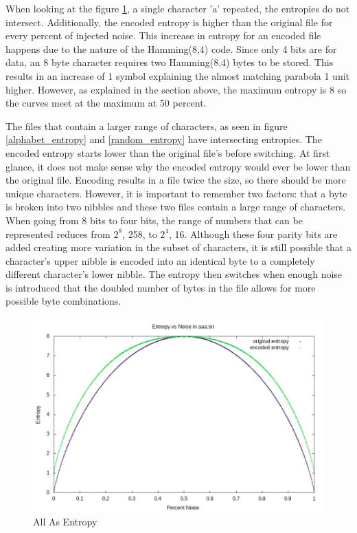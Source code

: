 \documentclass[12pt]{article}
\begin{document}
When looking at the figure \ref{aaa_entropy}, a single character 'a' repeated, the entropies
do not intersect.
Additionally, the encoded entropy is higher than the original file for every percent of injected
noise. This increase in entropy for an encoded file happens due to the nature of the Hamming(8,4)
code. Since only 4 bits are for data, an 8 byte character requires two Hamming(8,4) bytes to be
stored. This results in an increase of 1 symbol explaining the almost matching parabola 1 unit higher.
However, as explained in the section above, the maximum entropy is 8 so the curves meet at the maximum at 50 percent.

The files that contain a larger range of characters, as seen in figure \ref{alphabet_entropy}
and \ref{random_entropy} have intersecting entropies.
The encoded entropy starts lower than the original file's before switching.
At first glance, it does not make sense why the encoded entropy would ever be lower than the original file.
Encoding results in a file twice the size, so there should be more unique characters.
However, it is important to remember two factors: that a byte is broken into two nibbles and these two files contain a large range of characters.
When going from 8 bits to four bits, the range of numbers that can be represented reduces from $2^8$, 258, to $2^4$, 16.
Although these four parity bits are added creating more variation in the subset of characters, it is still possible that a character's upper nibble is encoded into an identical byte to a completely different character's lower nibble.
The entropy then switches when enough noise is introduced that the doubled number of bytes in the file allows for more possible byte combinations.

\begin{figure}[H]
    \caption{All As Entropy}\label{aaa_entropy}
    \includegraphics[width=6in]{aaa.txt.entropy.jpg}
    \centering
\end{figure}
\end{document}
